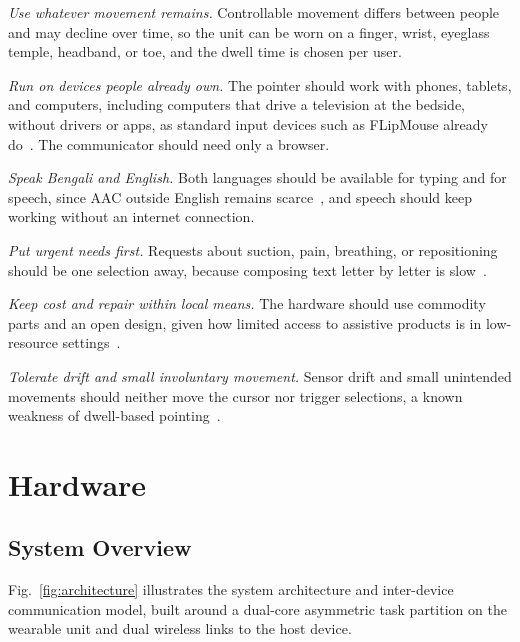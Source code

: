 \documentclass[journal]{IEEEtran}
\begin{document}
\begin{IEEEdescription}[\IEEEsetlabelwidth{G6}]
\item[G1] \textit{Use whatever movement remains.} Controllable movement differs between people and may decline over time, so the unit can be worn on a finger, wrist, eyeglass temple, headband, or toe, and the dwell time is chosen per user.
\item[G2] \textit{Run on devices people already own.} The pointer should work with phones, tablets, and computers, including computers that drive a television at the bedside, without drivers or apps, as standard input devices such as FLipMouse already do~\cite{flipmouse}. The communicator should need only a browser.
\item[G3] \textit{Speak Bengali and English.} Both languages should be available for typing and for speech, since AAC outside English remains scarce~\cite{amery2022}, and speech should keep working without an internet connection.
\item[G4] \textit{Put urgent needs first.} Requests about suction, pain, breathing, or repositioning should be one selection away, because composing text letter by letter is slow~\cite{waller2025}.
\item[G5] \textit{Keep cost and repair within local means.} The hardware should use commodity parts and an open design, given how limited access to assistive products is in low-resource settings~\cite{who2022,pryor2018}.
\item[G6] \textit{Tolerate drift and small involuntary movement.} Sensor drift and small unintended movements should neither move the cursor nor trigger selections, a known weakness of dwell-based pointing~\cite{jacob1990,hassan2019}.
\end{IEEEdescription}

\section{Hardware}
\label{sec:hardware}

\subsection{System Overview}
Fig.~\ref{fig:architecture} illustrates the system architecture and inter-device communication model, built around a dual-core asymmetric task partition on the wearable unit and dual wireless links to the host device. 
\end{document}

